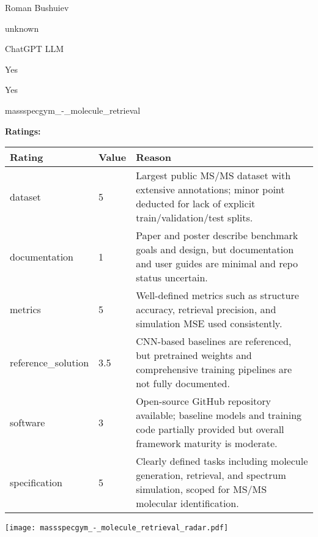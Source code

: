 {{\begin{description}[labelwidth=4cm, labelsep=1em, leftmargin=4cm, itemsep=0.1em, parsep=0em]
  \item[contact.name:] Roman Bushuiev
  \item[contact.email:] unknown
  \item[results.links.name:] ChatGPT LLM
  \item[fair.reproducible:] Yes
  \item[fair.benchmark\_ready:] Yes
  \item[id:] massspecgym\_-\_molecule\_retrieval
  \item[Citations:] \cite{neurips2024_c6c31413}
\end{description}

{\bf Ratings:} ~ \\

\begin{tabular}{p{} p{} p{}}
\hline
Rating & Value & Reason \\
\hline
dataset & 5 & Largest public MS/MS dataset with extensive annotations; minor point deducted for
lack of explicit train/validation/test splits.
 \\
documentation & 1 & Paper and poster describe benchmark goals and design, but documentation and user
guides are minimal and repo status uncertain.
 \\
metrics & 5 & Well-defined metrics such as structure accuracy, retrieval precision, and simulation MSE
used consistently.
 \\
reference\_solution & 3.5 & CNN-based baselines are referenced, but pretrained weights and comprehensive training
pipelines are not fully documented.
 \\
software & 3 & Open-source GitHub repository available; baseline models and training code partially
provided but overall framework maturity is moderate.
 \\
specification & 5 & Clearly defined tasks including molecule generation, retrieval, and spectrum simulation,
scoped for MS/MS molecular identification.
 \\
\hline
\end{tabular}

\texttt{[image: massspecgym\_-\_molecule\_retrieval\_radar.pdf]}
}}
\clearpage